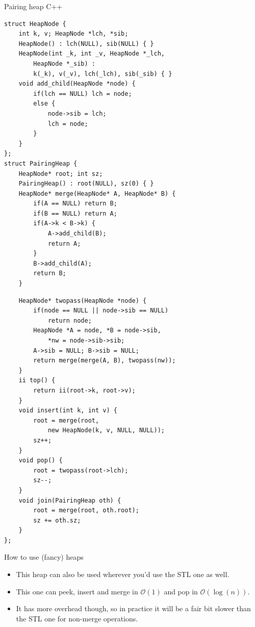 \documentclass{beamer}
\begin{document}
\begin{frame}{Pairing heap C++}
    \tiny
    \begin{multicols}{2}
    \begin{verbatim}
struct HeapNode {
    int k, v; HeapNode *lch, *sib;
    HeapNode() : lch(NULL), sib(NULL) { }
    HeapNode(int _k, int _v, HeapNode *_lch, 
        HeapNode *_sib) :
        k(_k), v(_v), lch(_lch), sib(_sib) { }
    void add_child(HeapNode *node) {
        if(lch == NULL) lch = node;
        else {
            node->sib = lch;
            lch = node;
        }
    }
};
struct PairingHeap {
    HeapNode* root; int sz;
    PairingHeap() : root(NULL), sz(0) { }
    HeapNode* merge(HeapNode* A, HeapNode* B) {
        if(A == NULL) return B;
        if(B == NULL) return A;
        if(A->k < B->k) {
            A->add_child(B);
            return A;
        }
        B->add_child(A);
        return B;
    }
    \end{verbatim}
    \columnbreak
    \begin{verbatim}
    HeapNode* twopass(HeapNode *node) {
        if(node == NULL || node->sib == NULL) 
            return node;
        HeapNode *A = node, *B = node->sib, 
            *nw = node->sib->sib;
        A->sib = NULL; B->sib = NULL;
        return merge(merge(A, B), twopass(nw));
    }
    ii top() {
        return ii(root->k, root->v);
    }
    void insert(int k, int v) {
        root = merge(root, 
            new HeapNode(k, v, NULL, NULL));
        sz++;
    }
    void pop() {
        root = twopass(root->lch);
        sz--;
    }
    void join(PairingHeap oth) {
        root = merge(root, oth.root);
        sz += oth.sz;
    }
};
    \end{verbatim}
    \end{multicols}
\end{frame}

\begin{frame}[plain]{How to use (fancy) heaps}
    \begin{itemize}
        \item This heap can also be used wherever you'd use the STL one as well.
        \item This one can peek, insert and merge in $\mathcal{O}(1)$ and pop in $\mathcal{O}(\log(n))$.
        \item It has more overhead though, so in practice it will be a fair bit slower than the STL one for non-merge operations.
    \end{itemize}
\end{frame}
\end{document}
